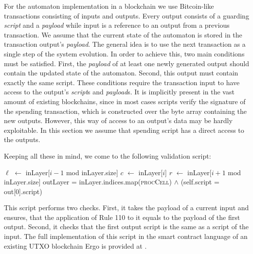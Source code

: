 \documentclass[runningheads]{llncs}
\newcommand{\payload}{\textit{payload}}
\newcommand{\script}{\textit{script}}
\def\Let#1#2{\State #1 $\gets$ #2}
\begin{document}
    For the automaton implementation in a blockchain we use Bitcoin-like
    transactions consisting of inputs and outputs. Every output consists of a
    guarding \script{} and a \payload{} while input is a reference to an
    output from a previous transaction.  We assume that the current state of the
    automaton is stored in the transaction output's \payload{}.  The general
    idea is to use the next transaction as a single step of the system
    evolution. In order to achieve this, two main conditions must be satisfied.
    First, the \payload{} of at least one newly generated output should contain
    the updated state of the automaton. Second, this output must contain exactly
    the same script. These conditions require the transaction input to have
    access to the output's \script{}s and \payload{}s.  It is implicitly present
    in the vast amount of existing blockchains, since in most cases scripts
    verify the signature of the spending transaction, which is constructed over
    the byte array containing the new outputs.  However, this way of access to
    an output's data may be hardly exploitable.  In this section we assume that
    spending script has a direct access to the outputs.

    Keeping all these in mind, we come to the following validation script:

    \begin{algorithm}[H]
        \caption{Script, that ensures that the transaction performs correct rule 110 transformation
        keeping the same rules for further iterations}
        \label{alg:isRule110}
        \begin{algorithmic}[1]
            \Let{$\ell$}{inLayer[$i-1$ mod inLayer.size]}
            \Let{$c$}{inLayer[$i$]}
            \Let{$r$}{inLayer[$i+1$ mod inLayer.size]}
            \State
            \Return {}
            \EndFunction
            \State \Return outLayer = inLayer.indices.map(\textsc{procCell})
            \EndFunction
            \State
            \Return {}
            $\wedge$ (self.script = out[0].script)
            \EndFunction
        \end{algorithmic}
    \end{algorithm}

    This script performs two checks. First, it takes the payload of a current
    input and ensures, that the application of Rule 110 to it equals to the
    payload of the first output. Second, it checks that the first output script
    is the same as a script of the input. The full implementation of this script
    in the smart contract language of an existing UTXO blockchain Ergo is
    provided at \cite{ergoScript1}.
\end{document}
